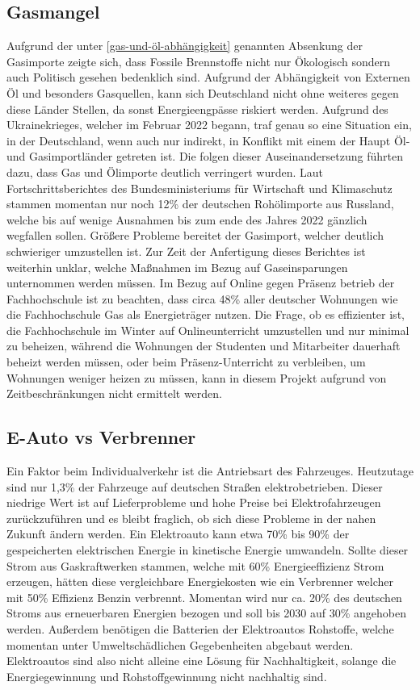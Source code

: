 \documentclass[a4paper,12pt]{scrartcl}
\begin{document}
\subsection{Gasmangel}
Aufgrund der unter \autoref{gas-und-öl-abhängigkeit} genannten Absenkung der Gasimporte zeigte sich, dass Fossile Brennstoffe nicht nur Ökologisch sondern auch Politisch gesehen bedenklich sind. Aufgrund der Abhängigkeit von Externen Öl und besonders Gasquellen, kann sich Deutschland nicht ohne weiteres gegen diese Länder Stellen, da sonst Energieengpässe riskiert werden. Aufgrund des Ukrainekrieges, welcher im Februar 2022 begann, traf genau so eine Situation ein, in der Deutschland, wenn auch nur indirekt, in Konflikt mit einem der Haupt Öl- und Gasimportländer getreten ist. Die folgen dieser Auseinandersetzung führten dazu, dass Gas und Ölimporte deutlich verringert wurden.
Laut Fortschrittsberichtes des Bundesministeriums für Wirtschaft und Klimaschutz stammen momentan nur noch 12\% der deutschen Rohölimporte aus Russland, welche bis auf wenige Ausnahmen bis zum ende des Jahres 2022 gänzlich wegfallen sollen. Größere Probleme bereitet der Gasimport, welcher deutlich schwieriger umzustellen ist.
Zur Zeit der Anfertigung dieses Berichtes ist weiterhin unklar, welche Maßnahmen im Bezug auf Gaseinsparungen unternommen werden müssen. Im Bezug auf Online gegen Präsenz betrieb der Fachhochschule ist zu beachten, dass circa 48\% aller deutscher Wohnungen wie die Fachhochschule Gas als Energieträger nutzen. Die Frage, ob es effizienter ist, die Fachhochschule im Winter auf Onlineunterricht umzustellen und nur minimal zu beheizen, während die Wohnungen der Studenten und Mitarbeiter dauerhaft beheizt werden müssen, oder beim Präsenz-Unterricht zu verbleiben, um Wohnungen weniger heizen zu müssen, kann in diesem Projekt aufgrund von Zeitbeschränkungen nicht ermittelt werden.

\subsection{E-Auto vs Verbrenner}
Ein Faktor beim Individualverkehr ist die Antriebsart des Fahrzeuges. Heutzutage sind nur 1,3\% der Fahrzeuge auf deutschen Straßen elektrobetrieben. Dieser niedrige Wert ist auf Lieferprobleme und hohe Preise bei Elektrofahrzeugen zurückzuführen und es bleibt fraglich, ob sich diese Probleme in der nahen Zukunft ändern werden. Ein Elektroauto kann etwa 70\% bis 90\% der gespeicherten elektrischen Energie in kinetische Energie umwandeln. Sollte dieser Strom aus Gaskraftwerken stammen, welche mit 60\% Energieeffizienz Strom erzeugen, hätten diese vergleichbare Energiekosten wie ein Verbrenner welcher mit 50\% Effizienz Benzin verbrennt.
Momentan wird nur ca. 20\% des deutschen Stroms aus erneuerbaren Energien bezogen und soll bis 2030 auf 30\% angehoben werden. Außerdem benötigen die Batterien der Elektroautos Rohstoffe, welche momentan unter Umweltschädlichen Gegebenheiten abgebaut werden. Elektroautos sind also nicht alleine eine Lösung für Nachhaltigkeit, solange die Energiegewinnung und Rohstoffgewinnung nicht nachhaltig sind.
\end{document}
